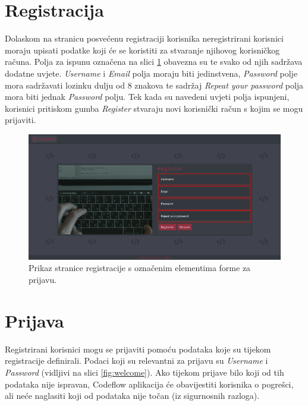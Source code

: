 \documentclass[times, utf8, zavrsni, numeric]{fer}
\begin{document}
		\section{Registracija}
		Dolaskom na stranicu posvećenu registraciji korisnika neregistrirani korisnici moraju upisati podatke koji će se koristiti za stvaranje njihovog korisničkog računa. Polja za ispunu označena na slici \ref{fig:register} obavezna su te svako od njih sadržava dodatne uvjete. \textit{Username} i \textit{Email} polja moraju biti jedinstvena, \textit{Password} polje mora sadržavati lozinku dulju od 8 znakova te sadržaj \textit{Repeat your password} polja mora biti jednak \textit{Password} polju. Tek kada su navedeni uvjeti polja ispunjeni, korisnici pritiskom gumba \textit{Register} stvaraju novi korisnički račun s kojim se mogu prijaviti.
		\begin{figure}[H]
			\centering
			\includegraphics[width=\linewidth]{pictures/koristenje/Registracija.png}
			\caption{Prikaz stranice registracije s označenim elementima forme za prijavu.}
			\label{fig:register}
		\end{figure}
	
		\section{Prijava}
		Registrirani korisnici mogu se prijaviti pomoću podataka koje su tijekom registracije definirali. Podaci koji su relevantni za prijavu su \textit{Username} i \textit{Password} (vidljivi na slici \ref{fig:welcome}). Ako tijekom prijave bilo koji od tih podataka nije ispravan, Codeflow aplikacija će obavijestiti korisnika o pogrešci, ali neće naglasiti koji od podataka nije točan (iz sigurnosnih razloga).
	
\end{document}
